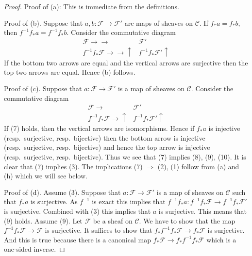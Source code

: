 \begin{proof}

Proof of (a): This is immediate from the definitions.

\medskip\noindent
Proof of (b). Suppose that $a, b : \mathcal{F} \to \mathcal{F}'$ are
maps of sheaves on $\mathcal{C}$. If $f_*a = f_*b$, then
$f^{-1}f_*a = f^{-1}f_*b$. Consider the commutative diagram
$$
\begin{array}{cc}\mathcal{F} \longrightarrow\longrightarrow & \mathcal{F}' \\ f^{-1}f_*\mathcal{F} \longrightarrow\longrightarrow\uparrow & f^{-1}f_*\mathcal{F}' \uparrow\end{array}
$$
If the bottom two arrows are equal and the vertical arrows are surjective
then the top two arrows are equal. Hence (b) follows.

\medskip\noindent
Proof of (c). Suppose that $a : \mathcal{F} \to \mathcal{F}'$ is a
map of sheaves on $\mathcal{C}$. Consider the commutative diagram
$$
\begin{array}{cc}\mathcal{F} \longrightarrow & \mathcal{F}' \\ f^{-1}f_*\mathcal{F} \longrightarrow\uparrow & f^{-1}f_*\mathcal{F}' \uparrow\end{array}
$$
If (7) holds, then the vertical arrows are isomorphisms.
Hence if $f_*a$ is injective (resp.\ surjective, resp.\ bijective)
then the bottom arrow is injective (resp.\ surjective, resp.\ bijective) and
hence the top arrow is injective (resp.\ surjective, resp.\ bijective).
Thus we see that (7) implies (8), (9), (10). It is clear that (7) implies (3).
The implications (7) $\Rightarrow$ (2), (1) follow from (a) and (h) which
we will see below.

\medskip\noindent
Proof of (d). Assume (3). Suppose that $a : \mathcal{F} \to \mathcal{F}'$
is a map of sheaves on $\mathcal{C}$ such that $f_*a$ is surjective.
As $f^{-1}$ is exact this implies that
$f^{-1}f_*a : f^{-1}f_*\mathcal{F} \to f^{-1}f_*\mathcal{F}'$
is surjective. Combined with (3) this implies that $a$ is surjective.
This means that (9) holds.
Assume (9). Let $\mathcal{F}$ be a sheaf on $\mathcal{C}$.
We have to show that the map $f^{-1}f_*\mathcal{F} \to \mathcal{F}$ is
surjective. It suffices to show that
$f_*f^{-1}f_*\mathcal{F} \to f_*\mathcal{F}$ is surjective.
And this is true because there is a canonical map
$f_*\mathcal{F} \to f_*f^{-1}f_*\mathcal{F}$ which is a one-sided inverse.


\end{proof}
